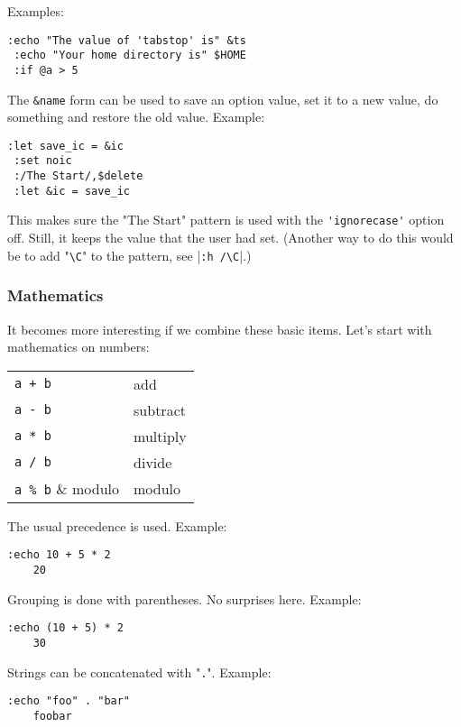Examples:

\begin{Verbatim}[samepage=true]
 :echo "The value of 'tabstop' is" &ts
 :echo "Your home directory is" $HOME
 :if @a > 5
\end{Verbatim}

The \verb!&name! form can be used to save an option value, set it to a new value, do something and restore the old value.
Example:

\begin{Verbatim}[samepage=true]
 :let save_ic = &ic
 :set noic
 :/The Start/,$delete
 :let &ic = save_ic
\end{Verbatim}

This makes sure the "The Start" pattern is used with the \verb!'ignorecase'! option off.
Still, it keeps the value that the user had set.
(Another way to do this would be to add "\verb!\C!" to the pattern, see |\verb!:h /\C!|.)

\subsubsection{Mathematics}
It becomes more interesting if we combine these basic items.
Let's start with mathematics on numbers:

\begin{center} \begin{tabular}{l l}
				\verb!a + b! & add \\
				\verb!a - b! & subtract \\
				\verb!a * b! & multiply \\
				\verb!a / b! & divide \\
				\verb!a % b! & modulo \\
\end{tabular} \end{center}

The usual precedence is used.
Example:

\begin{Verbatim}[samepage=true]
 :echo 10 + 5 * 2
    20
\end{Verbatim}

Grouping is done with parentheses.
No surprises here.
Example:

\begin{Verbatim}[samepage=true]
 :echo (10 + 5) * 2
    30
\end{Verbatim}

Strings can be concatenated with "\verb!.!".
Example:

\begin{Verbatim}[samepage=true]
 :echo "foo" . "bar"
    foobar
\end{Verbatim}

